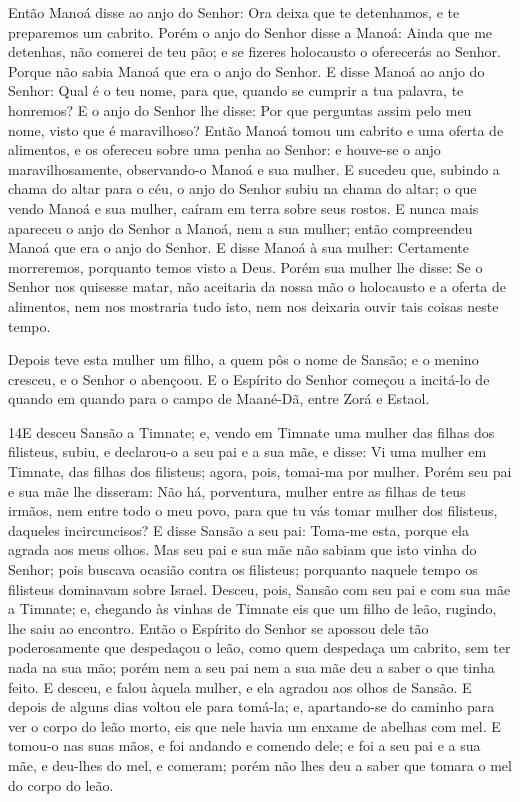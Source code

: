 Então Manoá disse ao anjo do Senhor: Ora deixa que te detenhamos,
e te preparemos um cabrito. Porém o anjo do Senhor disse a
Manoá: Ainda que me detenhas, não comerei de teu pão; e se fizeres
holocausto o oferecerás ao Senhor. Porque não sabia Manoá que era o
anjo do Senhor. E disse Manoá ao anjo do Senhor: Qual é o teu
nome, para que, quando se cumprir a tua palavra, te honremos?
E o anjo do Senhor lhe disse: Por que perguntas assim pelo
meu nome, visto que é maravilhoso? Então Manoá tomou um
cabrito e uma oferta de alimentos, e os ofereceu sobre uma penha ao
Senhor: e houve-se o anjo maravilhosamente, observando-o Manoá e sua
mulher. E sucedeu que, subindo a chama do altar para o céu, o
anjo do Senhor subiu na chama do altar; o que vendo Manoá e sua
mulher, caíram em terra sobre seus rostos. E nunca mais
apareceu o anjo do Senhor a Manoá, nem a sua mulher; então
compreendeu Manoá que era o anjo do Senhor. E disse Manoá à
sua mulher: Certamente morreremos, porquanto temos visto a Deus.
Porém sua mulher lhe disse: Se o Senhor nos quisesse matar,
não aceitaria da nossa mão o holocausto e a oferta de alimentos, nem
nos mostraria tudo isto, nem nos deixaria ouvir tais coisas neste
tempo.

Depois teve esta mulher um filho, a quem pôs o nome de Sansão; e
o menino cresceu, e o Senhor o abençoou. E o Espírito do
Senhor começou a incitá-lo de quando em quando para o campo de
Maané-Dã, entre Zorá e Estaol.

\medskip

\lettrine{14} E desceu Sansão a Timnate; e, vendo em Timnate
uma mulher das filhas dos filisteus, subiu, e declarou-o a seu
pai e a sua mãe, e disse: Vi uma mulher em Timnate, das filhas dos
filisteus; agora, pois, tomai-ma por mulher. Porém seu pai e sua
mãe lhe disseram: Não há, porventura, mulher entre as filhas de teus
irmãos, nem entre todo o meu povo, para que tu vás tomar mulher dos
filisteus, daqueles incircuncisos? E disse Sansão a seu pai: Toma-me
esta, porque ela agrada aos meus olhos. Mas seu pai e sua mãe
não sabiam que isto vinha do Senhor; pois buscava ocasião contra os
filisteus; porquanto naquele tempo os filisteus dominavam sobre
Israel. Desceu, pois, Sansão com seu pai e com sua mãe a
Timnate; e, chegando às vinhas de Timnate eis que um filho de leão,
rugindo, lhe saiu ao encontro. Então o Espírito do Senhor se
apossou dele tão poderosamente que despedaçou o leão, como quem
despedaça um cabrito, sem ter nada na sua mão; porém nem a seu pai
nem a sua mãe deu a saber o que tinha feito. E desceu, e falou
àquela mulher, e ela agradou aos olhos de Sansão. E depois de
alguns dias voltou ele para tomá-la; e, apartando-se do caminho para
ver o corpo do leão morto, eis que nele havia um enxame de abelhas
com mel. E tomou-o nas suas mãos, e foi andando e comendo dele;
e foi a seu pai e a sua mãe, e deu-lhes do mel, e comeram; porém não
lhes deu a saber que tomara o mel do corpo do leão.

